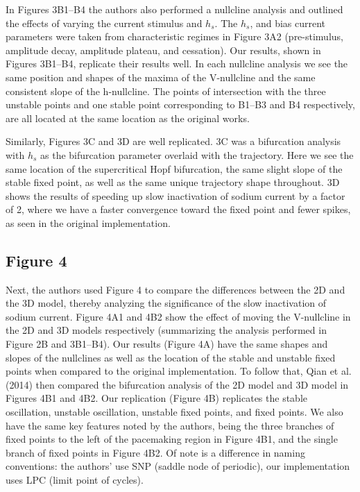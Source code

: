 In Figures 3B1--B4 the authors also performed a nullcline analysis and outlined the effects of varying the current stimulus and $h_s$. The $h_s$, and bias current parameters were taken from characteristic regimes in Figure 3A2 (pre-stimulus, amplitude decay, amplitude plateau, and cessation). Our results, shown in Figures 3B1--B4, replicate their results well. In each nullcline analysis we see the same position and shapes of the maxima of the V-nullcline and the same consistent slope of the h-nullcline. The points of intersection with the three unstable points and one stable point corresponding to B1--B3 and B4 respectively, are all located at the same location as the original works. 

Similarly, Figures 3C and 3D are well replicated. 3C was a bifurcation analysis with $h_s$ as the bifurcation parameter overlaid with the trajectory. Here we see the same location of the supercritical Hopf bifurcation, the same slight slope of the stable fixed point, as well as the same unique trajectory shape throughout. 3D shows the results of speeding up slow inactivation of sodium current by a factor of 2, where we have a faster convergence toward the fixed point and fewer spikes, as seen in the original implementation.



\subsection{Figure 4}
Next, the authors used Figure 4 to compare the differences between the 2D and the 3D model, thereby analyzing the significance of the slow inactivation of sodium current. Figure 4A1 and 4B2 show the effect of moving the V-nullcline in the 2D and 3D models respectively (summarizing the analysis performed in Figure 2B and 3B1--B4). Our results (Figure 4A) have the same shapes and slopes of the nullclines as well as the location of the stable and unstable fixed points when compared to the original implementation. To follow that, Qian et al. (2014) then compared the bifurcation analysis of the 2D model and 3D model in Figures 4B1 and 4B2. Our replication (Figure 4B) replicates the stable oscillation, unstable oscillation, unstable fixed points, and fixed points. We also have the same key features noted by the authors, being the three branches of fixed points to the left of the pacemaking region in Figure 4B1, and the single branch of fixed points in Figure 4B2. Of note is a difference in naming conventions: the authors' use SNP (saddle node of periodic), our implementation uses LPC (limit point of cycles).

